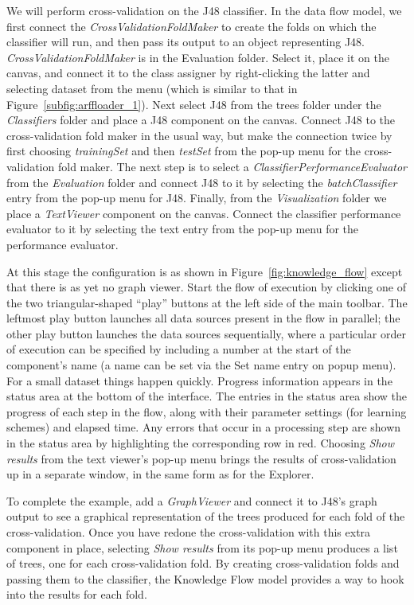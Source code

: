 We will perform cross-validation on the J48 classifier. In the data
flow model, we first connect the \textit{CrossValidationFoldMaker} to
create the folds on which the classifier will run, and then pass its
output to an object representing
J48. \textit{CrossValidationFoldMaker} is in the Evaluation
folder. Select it, place it on the canvas, and connect it to the class
assigner by right-clicking the latter and selecting dataset from the
menu (which is similar to that in
Figure~\ref{subfig:arffloader_1}). Next select J48 from the trees
folder under the \textit{Classifiers} folder and place a J48 component on the
canvas. Connect J48 to the cross-validation fold maker in the usual
way, but make the connection twice by first choosing \textit{trainingSet} and
then \textit{testSet} from the pop-up menu for the cross-validation fold
maker. The next step is to select a \textit{ClassifierPerformanceEvaluator}
from the \textit{Evaluation} folder and connect J48 to it by selecting the
\textit{batchClassifier} entry from the pop-up menu for J48. Finally, from the
\textit{Visualization} folder we place a \textit{TextViewer} component on the
canvas. Connect the classifier performance evaluator to it by
selecting the text entry from the pop-up menu for the performance
evaluator.

At this stage the configuration is as shown in
Figure~\ref{fig:knowledge_flow} except that there is as yet no graph
viewer. Start the flow of execution by clicking one of the two
triangular-shaped ``play'' buttons at the left side of the main
toolbar. The leftmost play button launches all data sources present in
the flow in parallel; the other play button launches the data sources
sequentially, where a particular order of execution can be specified
by including a number at the start of the component's name (a name can
be set via the Set name entry on popup menu). For a small dataset
things happen quickly. Progress information appears in the status area
at the bottom of the interface. The entries in the status area show
the progress of each step in the flow, along with their parameter
settings (for learning schemes) and elapsed time. Any errors that
occur in a processing step are shown in the status area by
highlighting the corresponding row in red. Choosing \textit{Show
results} from the text viewer's pop-up menu brings the results of
cross-validation up in a separate window, in the same form as for the
Explorer.

To complete the example, add a \textit{GraphViewer} and connect it to
J48's graph output to see a graphical representation of the trees
produced for each fold of the cross-validation. Once you have redone
the cross-validation with this extra component in place,
selecting \textit{Show results} from its pop-up menu produces a list
of trees, one for each cross-validation fold. By creating
cross-validation folds and passing them to the classifier, the
Knowledge Flow model provides a way to hook into the results for each
fold.

